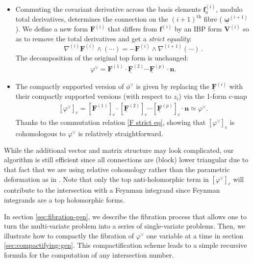\documentclass[11pt]{article}
\newcommand{\be}{\begin{equation}}
\newcommand{\ee}{\end{equation}}
\newcommand{\vphi}{\varphi}
\newcommand{\bs}[1]{\boldsymbol{#1}}
\newcommand{\mat}[1]{\underline{\boldsymbol{#1}}}
\begin{document}
\begin{itemize}
\item Commuting the covariant derivative across the basis elements $\bs{f}^{(i)}_a$, modulo total derivatives, determines the connection on
the $(i+1)^\text{th}$ fibre ( $\mat{\omega}^{(i+1)}$).
We define a new form $\bs{F}^{(i)}$ that differs from $\bs{f}^{(i)}$ by an IBP form $\bs{V}^{(i)}$ so as to remove the total derivatives and get a \emph{strict equality}:
\be
 \nabla^{(i)} \bs{F}^{(i)}\wedge(\cdots) =
-\bs{F}^{(i)} \wedge \nabla^{(i+1)}(\cdots)\,. \label{F strict eq}
\ee
The decomposition of the original top form is unchanged:
\begin{align}
	\vphi^\vee 
	= \bs{F}^{(1)} \cdot \underline{\bs{F}}^{(2)}
		\cdots \underline{\bs{F}}^{(p)} \cdot \bs{n} .
\end{align}
\item 
The compactly supported version of $\phi^\vee$ is given by replacing the $\underline{\bs{F}}^{(i)}$ with their compactly supported versions (with respect to $z_i$) via the 1-form c-map
\begin{align} \label{eq:phic}
	\boxed{
		[\vphi^\vee]_c = [ \bs{F}^{(1)} ]_c 
		\cdot [ \underline{\bs{F}}^{(2)} ]_c 
		\cdots  [ \underline{\bs{F}}^{(p)}]_c \cdot \bs{n} 
		\simeq \vphi^\vee.
	}
\end{align}
Thanks to the commutation relation \eqref{F strict eq},
showing that $[\vphi^\vee]_c$ is cohomologous to $\vphi^\vee$ is relatively straightforward.  
\end{itemize}
While the additional vector and matrix structure may look complicated, our algorithm is still efficient since all connections are (block) lower triangular due to that fact that we are using relative cohomology rather than the parametric deformation as in \cite{Mizera:2019gea, Mizera:2019vvs, Frellesvig:2019uqt}.  Note that only the top anti-holomorphic term in $[\vphi^\vee]_c$ will contribute
to the intersection with a Feynman integrand since Feynman integrands are a top holomorphic forms. 

In section \ref{sec:fibration-gen}, we describe the fibration process that allows one to turn the multi-variate problem into a series of single-variate problems. Then, we illustrate how to compactly the fibration of $\vphi^\vee$ one variable at a time in section \ref{sec:compactifying-gen}. This compactification scheme leads to a simple recursive formula for the computation of any intersection number.  


\end{document}
